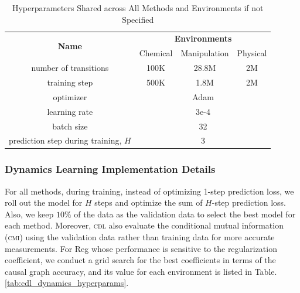 \begin{table}
\centering
\caption{Hyperparameters Shared across All Methods and Environments if not Specified}
\vspace{-0pt}
\begin{small}
\begin{tabular}{cccc}
\toprule
\multirow{2}{*}{\textbf{Name}}          & \multicolumn{3}{c}{\textbf{Environments}} \\
                                        & Chemical  & Manipulation  & Physical      \\
\midrule
number of transitions                   & 100K      & 28.8M         & 2M            \\
training step                           & 500K      & 1.8M          & 2M            \\
optimizer                               & \multicolumn{3}{c}{Adam}                  \\
learning rate                           & \multicolumn{3}{c}{3e-4}                  \\
batch size                              & \multicolumn{3}{c}{32}                    \\
prediction step during training, $H$    & \multicolumn{3}{c}{3}                     \\
\bottomrule
\end{tabular}
\end{small}
\vspace{-0pt}
\label{tab:general_hyperparams}
\end{table}

\subsubsection{Dynamics Learning Implementation Details}
\label{app:dynamics_learning}

For all methods, during training, instead of optimizing 1-step prediction loss, we roll out the model for $H$ steps and optimize the sum of $H$-step prediction loss. Also, we keep $10\%$ of the data as the validation data to select the best model for each method. Moreover, \textsc{cdl} also evaluate the conditional mutual information (\textsc{cmi}) using the validation data rather than training data for more accurate measurements. For Reg whose performance is sensitive to the regularization coefficient, we conduct a grid search for the best coefficients in terms of the causal graph accuracy, and its value for each environment is listed in Table. \ref{tab:cdl_dynamics_hyperparams}.

